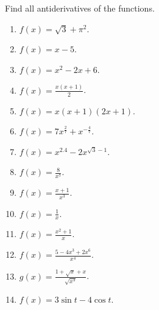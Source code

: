 Find all antiderivatives of the functions.
\begin{multicols}{3}
\begin{enumerate}
\item $\displaystyle f(x)=\sqrt {3}+\pi^2$.

\item $\displaystyle f(x)=x-5$.


\item $\displaystyle f(x)= x^2-2x+6$.


\item $\displaystyle f(x)=\frac{x(x+1)}{2} $.

\item $\displaystyle f(x)=x(x+1)(2x+1)$.

\item $\displaystyle f(x)=7x^{\frac{2}{7}}+x^{-\frac{4}{7}}$.

\item $\displaystyle f(x)=x^{2.4}-2x^{\sqrt{3}-1}$.

\item $\displaystyle f(x)=\frac{8}{x^7}$.

\item $\displaystyle f(x)=\frac{x+1}{x^3}$.

\item $\displaystyle f(x)=\frac{1}{x}$.

\item $\displaystyle f(x)=\frac{x^2+1}{x}$.

\item $\displaystyle f(x)=\frac{5-4x^3+2x^6}{x^4}$.

\item $\displaystyle g(x)=\frac{1+\sqrt{x}+x}{\sqrt{x^3}}$.

\item $\displaystyle f(x)=3\sin t-4\cos t$.


\end{enumerate}
\end{multicols}
